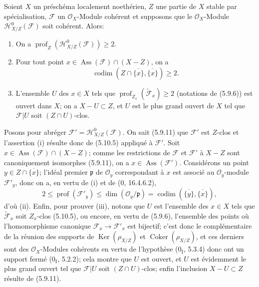 \begin{proposition}[5.10.10]
\label{IV.2.s5.10.10-fr}
Soient $X$ un préschéma localement noethérien, $Z$ une partie de $X$ stable
par spécialisation, $\mathcal F$ un $\mathcal O_X$-Module cohérent et supposons
que le $\mathcal O_X$-Module $\mathcal H^0_{X/Z}(\mathcal F)$ soit cohérent.
Alors:
\begin{enumerate}
\item[(i)] On a
$\operatorname{prof}_Z(\mathcal H^0_{X/Z}(\mathcal F))\geq2$.
\item[(ii)] Pour tout point
$x\in\operatorname{Ass}(\mathcal F)\cap(X-Z)$, on a
\[
\operatorname{codim}(Z\cap\overline{\{x\}},\overline{\{x\}})\geq2.
\]
\item[(iii)] L'ensemble $U$ des $x\in X$ tels que
$\operatorname{prof}_{Z_x}(\widetilde{\mathcal F}_x)\geq2$ (notations de
(5.9.6)) est ouvert dans $X$; on a $X-U\subset Z$, et $U$ est le plus grand
ouvert de $X$ tel que $\mathcal F|U$ soit $(Z\cap U)$-clos.
\end{enumerate}
\end{proposition}


Posons pour abréger $\mathcal F'=\mathcal H^0_{X/Z}(\mathcal F)$. On sait
(5.9.11) que $\mathcal F'$ est $Z$-clos et l'assertion (i) résulte donc de
(5.10.5) appliqué à $\mathcal F'$. Soit
$x\in\operatorname{Ass}(\mathcal F)\cap(X-Z)$; comme les restrictions de
$\mathcal F$ et $\mathcal F'$ à $X-Z$ sont canoniquement isomorphes (5.9.11),
on a $x\in\operatorname{Ass}(\mathcal F')$. Considérons un point
$y\in Z\cap\overline{\{x\}}$; l'idéal premier $\mathfrak p$ de
$\mathcal O_y$ correspondant à $x$ est associé au $\mathcal O_y$-module
$\mathcal F'_y$, donc on a, en vertu de (i) et de (0, 16.4.6.2),
\[
2\leq\operatorname{prof}(\mathcal F'_y)
\leq\dim(\mathcal O_y/\mathfrak p)
=\operatorname{codim}(\overline{\{y\}},\overline{\{x\}}),
\]
d'où (ii). Enfin, pour prouver (iii), notons que $U$ est l'ensemble des
$x\in X$ tels que $\widetilde{\mathcal F}_x$ soit $Z_x$-clos (5.10.5), ou
encore, en vertu de (5.9.6), l'ensemble des points où l'homomorphisme
canonique $\mathcal F_x\to\mathcal F'_x$ est bijectif; c'est donc le
complémentaire de la réunion des supports de $\operatorname{Ker}(\rho_{X/Z})$
et $\operatorname{Coker}(\rho_{X/Z})$, et ces derniers sont des
$\mathcal O_X$-Modules cohérents en vertu de l'hypothèse (0$_\mathrm I$,
5.3.4) donc ont un support fermé (0$_\mathrm I$, 5.2.2); cela montre que $U$
est ouvert, et $U$ est évidemment le plus grand ouvert tel que $\mathcal F|U$
soit $(Z\cap U)$-clos; enfin l'inclusion $X-U\subset Z$ résulte de (5.9.11).

